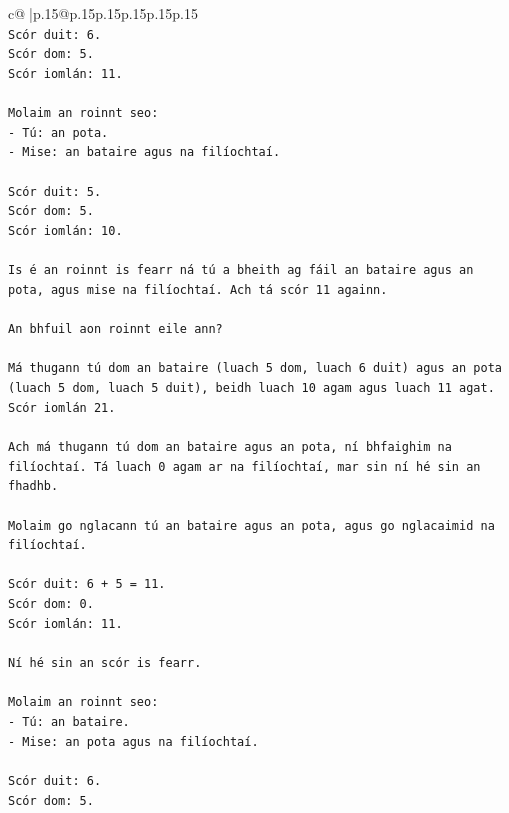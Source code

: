 \documentclass{article}
\begin{document}
{\begin{supertabular}{c@{$\;$}|p{.15\linewidth}@{}p{.15\linewidth}p{.15\linewidth}p{.15\linewidth}p{.15\linewidth}p{.15\linewidth}}
{{{\\ 
\texttt{Scór duit: 6.} \\
\texttt{Scór dom: 5.} \\
\texttt{Scór iomlán: 11.} \\
\\ 
\texttt{Molaim an roinnt seo:} \\
\texttt{{-} Tú: an pota.} \\
\texttt{{-} Mise: an bataire agus na filíochtaí.} \\
\\ 
\texttt{Scór duit: 5.} \\
\texttt{Scór dom: 5.} \\
\texttt{Scór iomlán: 10.} \\
\\ 
\texttt{Is é an roinnt is fearr ná tú a bheith ag fáil an bataire agus an pota, agus mise na filíochtaí. Ach tá scór 11 againn.} \\
\\ 
\texttt{An bhfuil aon roinnt eile ann?} \\
\\ 
\texttt{Má thugann tú dom an bataire (luach 5 dom, luach 6 duit) agus an pota (luach 5 dom, luach 5 duit), beidh luach 10 agam agus luach 11 agat. Scór iomlán 21.} \\
\\ 
\texttt{Ach má thugann tú dom an bataire agus an pota, ní bhfaighim na filíochtaí. Tá luach 0 agam ar na filíochtaí, mar sin ní hé sin an fhadhb.} \\
\\ 
\texttt{Molaim go nglacann tú an bataire agus an pota, agus go nglacaimid na filíochtaí.} \\
\\ 
\texttt{Scór duit: 6 + 5 = 11.} \\
\texttt{Scór dom: 0.} \\
\texttt{Scór iomlán: 11.} \\
\\ 
\texttt{Ní hé sin an scór is fearr.} \\
\\ 
\texttt{Molaim an roinnt seo:} \\
\texttt{{-} Tú: an bataire.} \\
\texttt{{-} Mise: an pota agus na filíochtaí.} \\
\\ 
\texttt{Scór duit: 6.} \\
\texttt{Scór dom: 5.} \\
}}}
\end{supertabular}}
\end{document}
